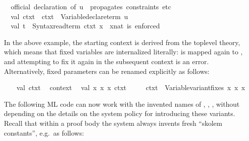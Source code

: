 \begin{isabellebody}
\isanewline
\ \ {\isacharparenleft}{\isacharasterisk}official\ declaration\ of\ u\ {\isacharminus}{\isacharminus}\ propagates\ constraints\ etc{\isachardot}{\isacharasterisk}{\isacharparenright}\isanewline
\ \ val\ ctxt{}\ {\isacharequal}\ ctxt{}\ {\isacharbar}{\isachargreater}\ Variable{\isachardot}declare{\isacharunderscore}term\ u{\isacharsemicolon}\isanewline
\ \ val\ t{}\ {\isacharequal}\ Syntax{\isachardot}read{\isacharunderscore}term\ ctxt{}\ {\isachardoublequote}x{\isachardoublequote}{\isacharsemicolon}\ \ {\isacharparenleft}{\isacharasterisk}x{\isacharcolon}{\isacharcolon}nat\ is\ enforced{\isacharasterisk}{\isacharparenright}\isanewline
{\isacharverbatimclose}%
\endisatagML
{\isafoldML}%
%
\isadelimML
%
\endisadelimML
%
\begin{isamarkuptext}%
In the above example, the starting context is derived from the
  toplevel theory, which means that fixed variables are internalized
  literally:  is mapped again to , and
  attempting to fix it again in the subsequent context is an error.
  Alternatively, fixed parameters can be renamed explicitly as
  follows:%
\end{isamarkuptext}%
\isamarkuptrue%
%
\isadelimML
%
\endisadelimML
%
\isatagML
{}\isamarkupfalse%
\ {\isacharverbatimopen}\isanewline
\ \ val\ ctxt{}\ {\isacharequal}\ %
\isaantiq
context%
\endisaantiq
{\isacharsemicolon}\isanewline
\ \ val\ {\isacharparenleft}{\isacharbrackleft}x{}{\isacharcomma}\ x{}{\isacharcomma}\ x{}{\isacharbrackright}{\isacharcomma}\ ctxt{}{\isacharparenright}\ {\isacharequal}\isanewline
\ \ \ \ ctxt{}\ {\isacharbar}{\isachargreater}\ Variable{\isachardot}variant{\isacharunderscore}fixes\ {\isacharbrackleft}{\isachardoublequote}x{\isachardoublequote}{\isacharcomma}\ {\isachardoublequote}x{\isachardoublequote}{\isacharcomma}\ {\isachardoublequote}x{\isachardoublequote}{\isacharbrackright}{\isacharsemicolon}\isanewline
{\isacharverbatimclose}%
\endisatagML
{\isafoldML}%
%
\isadelimML
%
\endisadelimML
%
\begin{isamarkuptext}%
The following ML code can now work with the invented names of
  , , , without depending on
  the details on the system policy for introducing these variants.
  Recall that within a proof body the system always invents fresh
  ``skolem constants'', e.g.\ as follows:%
\end{isamarkuptext}%
\isamarkuptrue%

\end{isabellebody}
